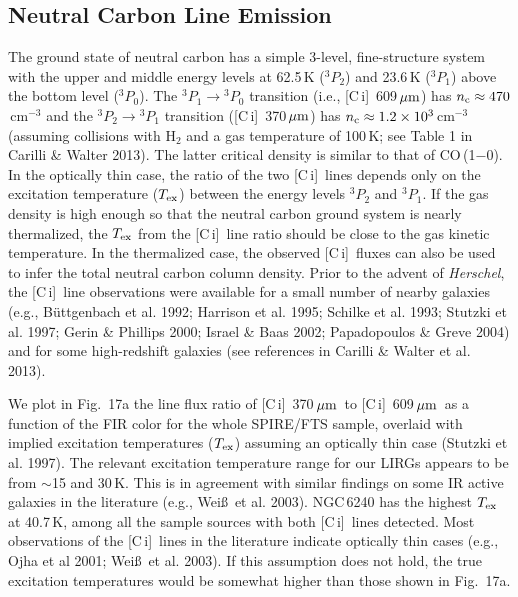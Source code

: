 \documentclass[preprint]{aastex}
\newcommand{\um}{\mbox{$\,\mu{\rm m}$}}
\newcommand{\Herschel}{{\it Herschel}}
\newcommand{\CI}{[C\,{\sc i}]}
\begin{document}
\subsection{Neutral Carbon Line Emission} \label{sec5.6}


The ground state of neutral carbon has a simple 3-level, fine-structure system
with the upper and middle energy levels at 62.5\,K ($^3P_2$) and 23.6\,K ($^3P_1$) 
above the bottom level ($^3P_0$).  The $^3P_1 \rightarrow$$^3P_0$ transition 
(i.e., \CI\ 609\um) has $n_{\rm c} \approx 470$\,cm$^{-3}$ and the $^3P_2 
\rightarrow$$^3P_1$ transition (\CI\ 370\um) has $n_{\rm c} \approx 1.2\times 
10^3$\,cm$^{-3}$ (assuming collisions with H$_2$ and a gas temperature of 100\,K; 
see Table 1 in Carilli \& Walter 2013).  The latter critical density is 
similar to that of CO\,(1$-$0).   In the optically thin case, the ratio of the 
two \CI\ lines depends only on the excitation temperature ($T_{\rm ex}$) between 
the energy levels $^3P_2$ and $^3P_1$.  If the gas density is high enough so 
that the neutral carbon ground system is nearly thermalized, the $T_{\rm ex}$ 
from the \CI\ line ratio should be close to the gas kinetic temperature.  In 
the thermalized case, the observed \CI\ fluxes can also be used to infer the total
neutral carbon column density. Prior to the advent of {\Herschel}, the \CI\ line 
observations were available for a small number of nearby galaxies (e.g., B\"uttgenbach 
et al. 1992;  Harrison et al. 1995; Schilke et al. 1993; Stutzki et al. 1997; 
Gerin \& Phillips 2000; Israel \& Baas 2002; Papadopoulos \& Greve 2004) and
for some high-redshift galaxies (see references in Carilli \& Walter et al. 2013).   




We plot in Fig.~17a the line flux ratio of \CI\ 370\um\ to \CI\ 609\um\ as a 
function of the FIR color for the whole SPIRE/FTS sample, overlaid with 
implied excitation temperatures ($T_{\rm ex}$) assuming an optically thin 
case (Stutzki et al. 1997).  The relevant excitation temperature range for 
our LIRGs appears to be from $\sim$15 and 30\,K.  This is in agreement with 
similar findings on some IR active galaxies in the literature (e.g., 
Wei\ss\ et al. 2003).  NGC\,6240 has the highest $T_{\rm ex}$ at 40.7\,K, 
among all the sample sources with both \CI\ lines detected.  
Most observations of the \CI\ lines in the literature indicate 
optically thin cases (e.g., Ojha et al 2001; Wei\ss\ et al. 2003).  
If this assumption does not hold, the true excitation temperatures would 
be somewhat higher than those shown in Fig.~17a. 
\end{document}
